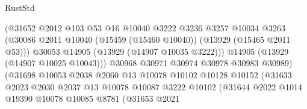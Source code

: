 \begin{lexlean}{RustStd}
\begin{coremodule}
                                        (@31652
                                          @2012
                                          @103
                                          @53
                                          @16
                                          @10040
                                          @3222
                                          @3236
                                          @3257
                                          @10034
                                          @3263
                                          (@30086
                                            @2011
                                            @10040
                                            (@15459 (@15460 @10040))
                                            (@13929 (@15465 @2011 @53)))
                                          @30053
                                          @14905
                                          (@13929 (@14907 @10035 @3222)))
                                        @14905
                                        (@13929 (@14907 @10025 @10043)))
                                      @30968
                                      @30971
                                      @30974
                                      @30978
                                      @30983
                                      @30989)
                                    (@31698
                                      @10053
                                      @2038
                                      @2060
                                      @13
                                      @10078
                                      @10102
                                      @10128
                                      @10152
                                      (@31633
                                        @2023
                                        @2030
                                        @2037
                                        @13
                                        @10078
                                        @10087
                                        @3222
                                        @10102
                                        (@31644
                                          @2022
                                          @1014
                                          @19390
                                          @10078
                                          @10085
                                          @8781
                                          (@31653
                                            @2021

\end{coremodule}
\end{lexlean}
